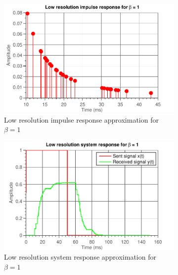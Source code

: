 \documentclass[11pt,titlepage]{report}
\begin{document}
\begin{figure}[H]
	\centering
	\begin{subfigure}{0.49\textwidth}
		\includegraphics[width=\textwidth]{../../deliverable-7-resources/figures/ass-1/report-1/ass-1-report-1-impulse-response-2-copies-beta-1.pdf}
		\caption{\centering Low resolution impulse response approximation for $\beta=1$}
	\end{subfigure}
	\begin{subfigure}{0.49\textwidth}
		\includegraphics[width=\textwidth]{../../deliverable-7-resources/figures/ass-1/report-1/ass-1-report-1-system-response-2-copies-beta-1.pdf}
		\caption{\centering Low resolution system response approximation for $\beta=1$}
	\end{subfigure}
	\begin{subfigure}{0.49\textwidth}

\end{subfigure}
\end{figure}
\end{document}

